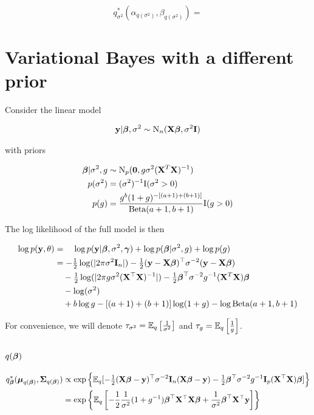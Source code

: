 \documentclass{amsart}[12pt]
\begin{document}
\begin{equation*}
q^*_{\sigma^2}(\alpha_{q(\sigma^2)}, \beta_{q(\sigma^2)}) = 
\end{equation*}

\section{Variational Bayes with a different prior}

Consider the linear model

\begin{align*}
{\bf y} | {\boldsymbol \beta}, \sigma^2 \sim \text{N}_n({\bf X} {\boldsymbol \beta}, \sigma^2 {\bf I})
\end{align*}

with priors

\begin{align*}
{\boldsymbol\beta} | \sigma^2, g &\sim \text{N}_p({\bf 0}, g \sigma^2 ({\bf X}^T {\bf X})^{-1}) \\
p(\sigma^2) &= (\sigma^2)^{-1} \text{I}(\sigma^2 > 0) \\
p(g) &= \frac{g^b (1 + g)^{-[(a + 1) + (b + 1)]}}{\text{Beta} (a + 1, b + 1)} \text{I}(g > 0)
\end{align*}

The log likelihood of the full model is then

\begin{align*}
\log p({\bf y}, \theta) &= \quad\log p({\bf y}|{\boldsymbol \beta}, \sigma^2, {\boldsymbol \gamma}) + \log p({\boldsymbol \beta} | \sigma^2, g) +  \log p(g) \\
&= -\tfrac{1}{2} \log(|2 \pi \sigma^2 {\bf I}_n|) - \tfrac{1}{2} ({\bf y} - {\bf X} {\boldsymbol \beta})^\top \sigma^{-2} ({\bf y} - {\bf X} {\boldsymbol \beta}) \\
&\quad -\tfrac{1}{2} \log(|2 \pi g \sigma^2 ({\bf X}^\top {\bf X})^{-1}|) -\tfrac{1}{2} {\boldsymbol \beta}^\top \sigma^{-2} g^{-1} ({\bf X}^T {\bf X}) {\boldsymbol \beta} \\
&\quad - \log (\sigma^2) \\
&\quad + b \log g - [(a + 1) + (b + 1)] \log (1 + g) - \log \text{Beta} (a + 1, b + 1)
\end{align*}

For convenience, we will denote $\tau_{\sigma^2} = \mathbb{E}_q \left[ \frac{1}{\sigma^2} \right]$ and $\tau_{g} =
\mathbb{E}_q \left[ \frac{1}{g} \right]$.


\subsection{$q({\boldsymbol \beta})$}

\begin{align*}
q_{\boldsymbol \beta}^*({\boldsymbol \mu}_{q({\boldsymbol \beta})}, {\boldsymbol \Sigma}_{q({\boldsymbol \beta})}) &\propto \exp \left \{ \mathbb{E}_q[-\tfrac{1}{2} ({\bf X} {\boldsymbol \beta} - {\bf y})^\top \sigma^{-2} {\bf I}_n ({\bf X} {\boldsymbol \beta} - {\bf y}) - \tfrac{1}{2} {\boldsymbol \beta}^\top \sigma^{-2} g^{-1} {\bf I}_p ({\bf X}^\top {\bf X}) {\boldsymbol \beta}] \right \}\\
&= \exp \left \{ \mathbb{E}_q \left[-\frac{1}{2} \frac{1}{\sigma^2} (1 + g^{-1}){\boldsymbol \beta}^\top {\bf X}^\top {\bf X} {\boldsymbol\beta} + \frac{1}{\sigma^2}{\boldsymbol \beta}^\top {\bf X}^\top {\bf y} \right] \right \}
\end{align*}
\end{document}
